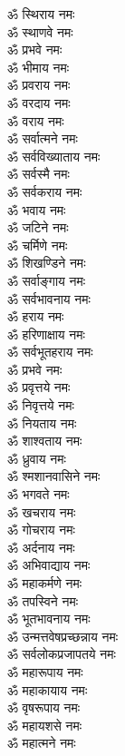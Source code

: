 \begin{multicols}{2}
\begin{flushleft}
ॐ स्थिराय नमः\\
ॐ स्थाणवे नमः\\
ॐ प्रभवे नमः\\
ॐ भीमाय नमः\\
ॐ प्रवराय नमः\\
ॐ वरदाय नमः\\
ॐ वराय नमः\\
ॐ सर्वात्मने नमः\\
ॐ सर्वविख्याताय नमः\\
ॐ सर्वस्मै नमः\hfill{}\\
ॐ सर्वकराय नमः\\
ॐ भवाय नमः\\
ॐ जटिने नमः\\
ॐ चर्मिणे नमः\\
ॐ शिखण्डिने नमः\\
ॐ सर्वाङ्गाय नमः\\
ॐ सर्वभावनाय नमः\\
ॐ हराय नमः\\
ॐ हरिणाक्षाय नमः\\
ॐ सर्वभूतहराय नमः\hfill{}\\
ॐ प्रभवे नमः\\
ॐ प्रवृत्तये नमः\\
ॐ निवृत्तये नमः\\
ॐ नियताय नमः\\
ॐ शाश्वताय नमः\\
ॐ ध्रुवाय नमः\\
ॐ श्मशानवासिने नमः\\
ॐ भगवते नमः\\
ॐ खचराय नमः\\
ॐ गोचराय नमः\hfill{}\\
ॐ अर्दनाय नमः\\
ॐ अभिवाद्याय नमः\\
ॐ महाकर्मणे नमः\\
ॐ तपस्विने नमः\\
ॐ भूतभावनाय नमः\\
ॐ उन्मत्तवेषप्रच्छन्नाय नमः\\
ॐ सर्वलोकप्रजापतये नमः\\
ॐ महारूपाय नमः\\
ॐ महाकायाय नमः\\
ॐ वृषरूपाय नमः\hfill{}\\
ॐ महायशसे नमः\\
ॐ महात्मने नमः\\

\end{flushleft}
\end{multicols}
